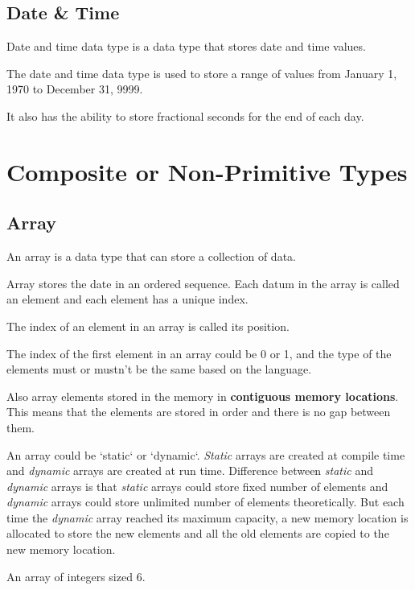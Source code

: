 \documentclass{book}
\begin{document}
\subsection{Date \& Time}

    Date and time data type is a data type that stores date and time values.

    \noindent The date and time data type is used to store a range of values from January 1, 1970 to December 31, 9999.

    \noindent It also has the ability to store fractional seconds for the end of each day.
    
\section{Composite or Non-Primitive Types}

\subsection{Array}

    An array is a data type that can store a collection of data.
    
    \noindent Array stores the date in an ordered sequence. Each datum in the array is called an element and each element has a unique index.

    \noindent The index of an element in an array is called its position.

    \noindent The index of the first element in an array could be 0 or 1, and the type of the elements must or mustn't be the same based on the language.

    \noindent Also array elements stored in the memory in \textbf{contiguous memory locations}. This means that the elements are stored in order and there is no gap between them.
    
    \noindent An array could be `static` or `dynamic`. \textit{Static} arrays are created at compile time and \textit{dynamic} arrays are created at run time. Difference between \textit{static} and \textit{dynamic} arrays is that \textit{static} arrays could store fixed number of elements and \textit{dynamic} arrays could store unlimited number of elements theoretically. But each time the \textit{dynamic} array reached its maximum capacity, a new memory location is allocated to store the new elements and all the old elements are copied to the new memory location.
    \hfill \break \break
    \begin{center}
    \break
    \caption{An array of integers sized 6.}
    \end{center}
\end{document}

